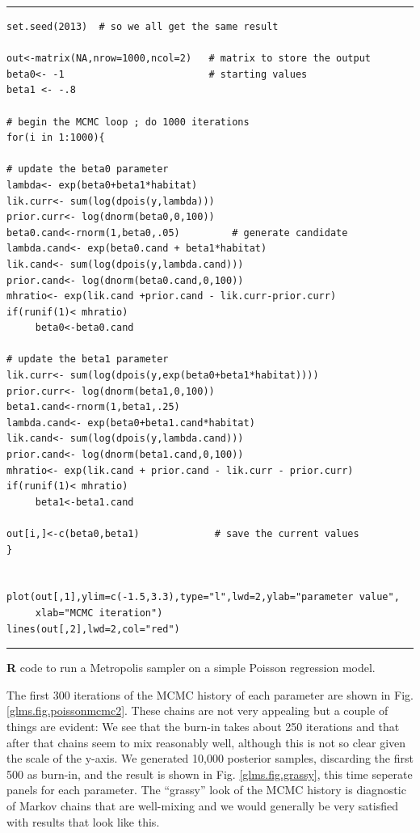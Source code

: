 \begin{panel}[htp]
\centering
\rule[0.15in]{\textwidth}{.03in}
{\small
\begin{verbatim}
set.seed(2013)  # so we all get the same result

out<-matrix(NA,nrow=1000,ncol=2)   # matrix to store the output
beta0<- -1                         # starting values
beta1 <- -.8

# begin the MCMC loop ; do 1000 iterations
for(i in 1:1000){

# update the beta0 parameter
lambda<- exp(beta0+beta1*habitat)
lik.curr<- sum(log(dpois(y,lambda)))
prior.curr<- log(dnorm(beta0,0,100))
beta0.cand<-rnorm(1,beta0,.05)         # generate candidate
lambda.cand<- exp(beta0.cand + beta1*habitat)
lik.cand<- sum(log(dpois(y,lambda.cand)))
prior.cand<- log(dnorm(beta0.cand,0,100))
mhratio<- exp(lik.cand +prior.cand - lik.curr-prior.curr)
if(runif(1)< mhratio)
     beta0<-beta0.cand

# update the beta1 parameter
lik.curr<- sum(log(dpois(y,exp(beta0+beta1*habitat))))
prior.curr<- log(dnorm(beta1,0,100))
beta1.cand<-rnorm(1,beta1,.25)
lambda.cand<- exp(beta0+beta1.cand*habitat)
lik.cand<- sum(log(dpois(y,lambda.cand)))
prior.cand<- log(dnorm(beta1.cand,0,100))
mhratio<- exp(lik.cand + prior.cand - lik.curr - prior.curr)
if(runif(1)< mhratio)
     beta1<-beta1.cand

out[i,]<-c(beta0,beta1)             # save the current values
}


plot(out[,1],ylim=c(-1.5,3.3),type="l",lwd=2,ylab="parameter value",
     xlab="MCMC iteration")
lines(out[,2],lwd=2,col="red")
\end{verbatim}
}
\rule[-0.15in]{\textwidth}{.03in}
\caption{
{\bf R} code to run a Metropolis sampler on a simple Poisson regression model.
}
\label{glms.panel.poisreg}
\end{panel}

The first 300 iterations of the MCMC history of each parameter
are shown in Fig. \ref{glms.fig.poissonmcmc2}. These chains are
not very appealing but a couple of things are evident: 
We see
that the burn-in takes about 250 iterations and that after that chains seem to mix 
reasonably well, although this is not so clear given the scale of the y-axis.
We generated 10,000 posterior samples,
discarding the first 500 as burn-in, and the result is shown in
Fig. \ref{glms.fig.grassy}, this time seperate panels for each
parameter.
The ``grassy''
look of the MCMC history is diagnostic of Markov chains that are
well-mixing and we would generally be very satisfied with results that
look like this.


